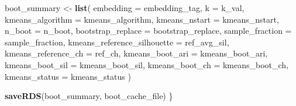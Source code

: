 \documentclass[
  11pt,
]{article}
\newenvironment{Shaded}{\begin{snugshade}}{\end{snugshade}}
\newcommand{\AttributeTok}[1]{\textcolor[rgb]{0.13,0.29,0.53}{#1}}
\newcommand{\FunctionTok}[1]{\textcolor[rgb]{0.13,0.29,0.53}{\textbf{#1}}}
\newcommand{\NormalTok}[1]{#1}
\newcommand{\OtherTok}[1]{\textcolor[rgb]{0.56,0.35,0.01}{#1}}
\begin{document}
\begin{Shaded}
\begin{Highlighting}[]
\NormalTok{      boot\_summary }\OtherTok{\textless{}{-}} \FunctionTok{list}\NormalTok{(}
        \AttributeTok{embedding                     =}\NormalTok{ embedding\_tag,}
        \AttributeTok{k                             =}\NormalTok{ k\_val,}
        \AttributeTok{kmeans\_algorithm              =}\NormalTok{ kmeans\_algorithm,}
        \AttributeTok{kmeans\_nstart                 =}\NormalTok{ kmeans\_nstart,}
        \AttributeTok{n\_boot                        =}\NormalTok{ n\_boot,}
        \AttributeTok{bootstrap\_replace             =}\NormalTok{ bootstrap\_replace,}
        \AttributeTok{sample\_fraction               =}\NormalTok{ sample\_fraction,}
        \AttributeTok{kmeans\_reference\_silhouette   =}\NormalTok{ ref\_avg\_sil,}
        \AttributeTok{kmeans\_reference\_ch           =}\NormalTok{ ref\_ch,}
        \AttributeTok{kmeans\_boot\_ari               =}\NormalTok{ kmeans\_boot\_ari,}
        \AttributeTok{kmeans\_boot\_sil               =}\NormalTok{ kmeans\_boot\_sil,}
        \AttributeTok{kmeans\_boot\_ch                =}\NormalTok{ kmeans\_boot\_ch,}
        \AttributeTok{kmeans\_status                 =}\NormalTok{ kmeans\_status}
\NormalTok{      )}

      \FunctionTok{saveRDS}\NormalTok{(boot\_summary, boot\_cache\_file)}
\NormalTok{    \}}


\end{Highlighting}
\end{Shaded}
\end{document}
